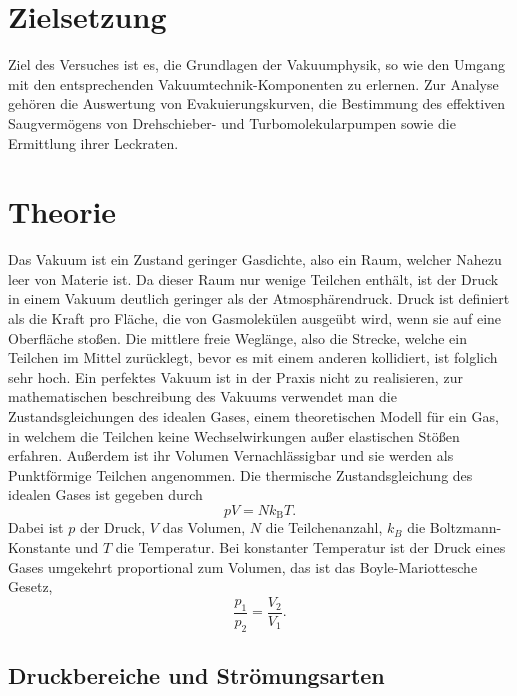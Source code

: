 
\section{Zielsetzung}
\label{sec:Zielsetzung}
Ziel des Versuches ist es, die Grundlagen der Vakuumphysik, so wie den Umgang mit
den entsprechenden Vakuumtechnik-Komponenten zu erlernen. Zur Analyse gehören die Auswertung 
von Evakuierungskurven, die Bestimmung des effektiven Saugvermögens von Drehschieber- und Turbomolekularpumpen sowie 
die Ermittlung ihrer Leckraten.

\section{Theorie}
\label{sec:Theorie}

Das Vakuum ist ein Zustand geringer Gasdichte, also ein Raum, welcher Nahezu leer von Materie ist.
Da dieser Raum nur wenige Teilchen enthält, ist der Druck in einem Vakuum deutlich geringer als der Atmosphärendruck.
Druck ist definiert als die Kraft pro Fläche, die von Gasmolekülen ausgeübt wird, wenn sie auf
eine Oberfläche stoßen. Die mittlere freie Weglänge, also die Strecke, welche ein Teilchen im Mittel zurücklegt, bevor es
mit einem anderen kollidiert, ist folglich sehr hoch. Ein perfektes Vakuum ist in der Praxis nicht zu realisieren, zur mathematischen 
beschreibung des Vakuums verwendet man die Zustandsgleichungen des idealen Gases, einem theoretischen Modell für ein 
Gas, in welchem die Teilchen keine Wechselwirkungen außer elastischen Stößen erfahren. Außerdem ist ihr Volumen Vernachlässigbar 
und sie werden als Punktförmige Teilchen angenommen.
Die thermische Zustandsgleichung des idealen Gases ist gegeben durch
\begin{equation}
     p V=N k_\text{B} T .
    \label{eq:idealgaslaw}
\end{equation}  
Dabei ist \( p \) der Druck, \( V \) das Volumen, \( N \) die Teilchenanzahl, \( k_B \) die Boltzmann-Konstante
 und \( T \) die Temperatur.
Bei konstanter Temperatur ist der Druck eines Gases umgekehrt proportional zum Volumen, das ist das Boyle-Mariottesche Gesetz,
\begin{equation}
    \frac{p_1}{p_2}=  \frac{V_2}{V_1}.
    \label{eq:boylemariotte}
\end{equation}


\subsection{Druckbereiche und Strömungsarten}


